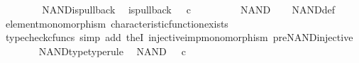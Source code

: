 \begin{isabellebody}
\ \ \ \ \isamarkupfalse%
\isanewline
\ \ \isamarkupfalse%
\isanewline
{}\isamarkupfalse%
%
\endisatagproof
{\isafoldproof}%
%
\isadelimproof
\isanewline
%
\endisadelimproof
\isanewline
{}\isamarkupfalse%
\ NAND{\isacharunderscore}{\kern0pt}is{\isacharunderscore}{\kern0pt}pullback{\isacharcolon}{\kern0pt}\isanewline
\ \ {\isachardoublequoteopen}is{\isacharunderscore}{\kern0pt}pullback\ {\isacharparenleft}{\kern0pt}{\isasymone}{\isasymCoprod}{\isacharparenleft}{\kern0pt}{\isasymone}{\isasymCoprod}{\isasymone}{\isacharparenright}{\kern0pt}{\isacharparenright}{\kern0pt}\ {\isasymone}\ {\isacharparenleft}{\kern0pt}{\isasymOmega}{\isasymtimes}\isactrlsub c{\isasymOmega}{\isacharparenright}{\kern0pt}\ {\isasymOmega}\ {\isacharparenleft}{\kern0pt}{\isasymbeta}\isactrlbsub {\isacharparenleft}{\kern0pt}{\isasymone}{\isasymCoprod}{\isacharparenleft}{\kern0pt}{\isasymone}{\isasymCoprod}{\isasymone}{\isacharparenright}{\kern0pt}{\isacharparenright}{\kern0pt}\isactrlesub {\isacharparenright}{\kern0pt}\ {\isasymt}\ {\isacharparenleft}{\kern0pt}{\isasymlangle}{\isasymf}{\isacharcomma}{\kern0pt}\ {\isasymf}{\isasymrangle}{\isasymamalg}\ {\isacharparenleft}{\kern0pt}{\isasymlangle}{\isasymt}{\isacharcomma}{\kern0pt}\ {\isasymf}{\isasymrangle}\ {\isasymamalg}{\isasymlangle}{\isasymf}{\isacharcomma}{\kern0pt}\ {\isasymt}{\isasymrangle}{\isacharparenright}{\kern0pt}{\isacharparenright}{\kern0pt}\ NAND{\isachardoublequoteclose}\isanewline
%
\isadelimproof
\ \ %
\endisadelimproof
%
\isatagproof
{}\isamarkupfalse%
\ NAND{\isacharunderscore}{\kern0pt}def\isanewline
\ \ \isamarkupfalse%
\ element{\isacharunderscore}{\kern0pt}monomorphism\ characteristic{\isacharunderscore}{\kern0pt}function{\isacharunderscore}{\kern0pt}exists\isanewline
\ \ \isamarkupfalse%
\ {\isacharparenleft}{\kern0pt}typecheck{\isacharunderscore}{\kern0pt}cfuncs{\isacharcomma}{\kern0pt}\ simp\ add{\isacharcolon}{\kern0pt}\ the{}I{}\ injective{\isacharunderscore}{\kern0pt}imp{\isacharunderscore}{\kern0pt}monomorphism\ pre{\isacharunderscore}{\kern0pt}NAND{\isacharunderscore}{\kern0pt}injective{\isacharparenright}{\kern0pt}%
\endisatagproof
{\isafoldproof}%
%
\isadelimproof
\isanewline
%
\endisadelimproof
\ \ \ \ \ \ \isanewline
{}\isamarkupfalse%
\ NAND{\isacharunderscore}{\kern0pt}type{\isacharbrackleft}{\kern0pt}type{\isacharunderscore}{\kern0pt}rule{\isacharbrackright}{\kern0pt}{\isacharcolon}{\kern0pt}\isanewline
\ \ {\isachardoublequoteopen}NAND\ {\isacharcolon}{\kern0pt}\ {\isasymOmega}\ {\isasymtimes}\isactrlsub c\ {\isasymOmega}\ {\isasymrightarrow}\ {\isasymOmega}{\isachardoublequoteclose}\isanewline

\end{isabellebody}
